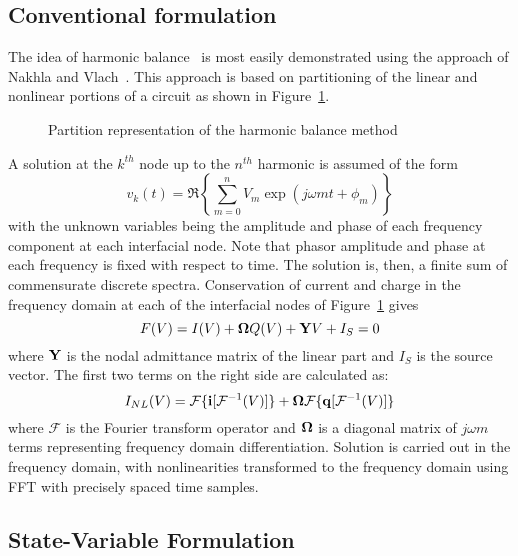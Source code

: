 \subsection{Conventional formulation}

 The idea of harmonic balance~\cite{steer2:1996} is most easily
demonstrated using the approach of Nakhla and
Vlach~\cite{nakhla:vlach:76}. This approach is based on partitioning
of the linear and nonlinear portions of a circuit as shown in
Figure~\ref{hb1}.

\begin{figure}[htpb]
\centerline{\epsfxsize=3in {}}
\caption{Partition representation of the harmonic
balance method} \label{hb1}
\end{figure}

A solution at the $k^{th}$ node up to the $n^{th}$ harmonic is assumed
of the form
\begin{equation}
  v_k(t)= \Re \left\{ \sum_{m=0}^n V_m 
  \exp(j \omega m t + \phi_m) \right\} \label{eq_hb1}
\end{equation}
with the unknown variables being the amplitude and phase of each
frequency component at each interfacial node. Note that phasor
amplitude and phase at each frequency is fixed with respect to time.
The solution is, then, a finite sum of commensurate discrete
spectra. Conservation of current and charge in the frequency domain
at each of the interfacial nodes of Figure~\ref{hb1} gives
\begin{equation}
  F(V)= I(V) + {\bf \Omega} Q(V) + {\bf Y} V + I_S = 0 \label{eq9}
\end{equation}
where ${\bf Y}$ is the nodal admittance matrix of the linear part and
$I_S$ is the source vector. The first two terms on the right side are
calculated as:
\begin{equation}
  I_{NL}(V)= {\mathcal{F}}\{{\bf i}[{\mathcal{F}}^{-1}(V)]\} + {\bf \Omega}
             {\mathcal{F}}\{{\bf q}[{\mathcal{F}}^{-1}(V)]\}
\end{equation}
where $\mathcal{F}$ is the Fourier transform operator and ${\bf \Omega}$
is a diagonal matrix of $j\omega m$ terms representing
frequency domain differentiation. Solution is carried out in the
frequency domain, with nonlinearities transformed to the frequency
domain using FFT with precisely spaced time samples. 

\subsection{State-Variable Formulation} \label{subsection:rizzoli}

